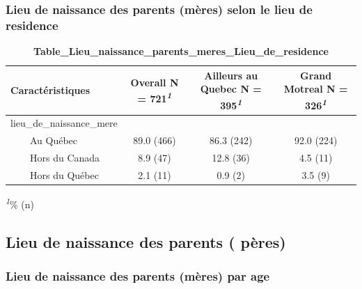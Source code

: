 \documentclass[
]{article}
\begin{document}
\hypertarget{lieu-de-naissance-des-parents-muxe8res-selon-le-lieu-de-residence}{%
\subsubsection{Lieu de naissance des parents (mères) selon le lieu de
residence}\label{lieu-de-naissance-des-parents-muxe8res-selon-le-lieu-de-residence}}

\newpage
\begin{table}[!t]
\caption{\label{tab:unnamed-chunk-31}\textbf{Table\_Lieu\_naissance\_parents\_meres\_Lieu\_de\_residence}} 
\fontsize{12.0pt}{14.4pt}\selectfont
\begin{tabular*}{\linewidth}{@{\extracolsep{\fill}}lccc}
\toprule
\textbf{Caractéristiques} & \textbf{Overall}  N = 721\textsuperscript{\textit{1}} & \textbf{Ailleurs au Quebec}  N = 395\textsuperscript{\textit{1}} & \textbf{Grand Motreal}  N = 326\textsuperscript{\textit{1}} \\ 
\midrule\addlinespace[2.5pt]
lieu\_de\_naissance\_mere &  &  &  \\ 
    Au Québec & 89.0 (466) & 86.3 (242) & 92.0 (224) \\ 
    Hors du Canada & 8.9 (47) & 12.8 (36) & 4.5 (11) \\ 
    Hors du Québec & 2.1 (11) & 0.9 (2) & 3.5 (9) \\ 
\bottomrule
\end{tabular*}
\begin{minipage}{\linewidth}
\textsuperscript{\textit{1}}\% (n)\\
\end{minipage}
\end{table}
\vspace{1cm}

\hypertarget{lieu-de-naissance-des-parents-puxe8res}{%
\subsection{Lieu de naissance des parents (
pères)}\label{lieu-de-naissance-des-parents-puxe8res}}

\vspace{1cm}

\hypertarget{lieu-de-naissance-des-parents-muxe8res-par-age}{%
\subsubsection{Lieu de naissance des parents (mères) par
age}\label{lieu-de-naissance-des-parents-muxe8res-par-age}}
\end{document}

